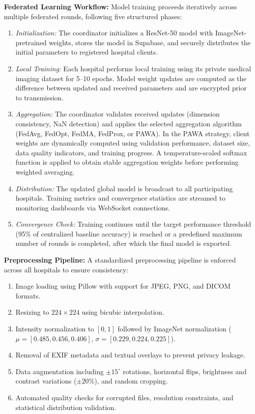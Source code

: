 \textbf{Federated Learning Workflow:}
Model training proceeds iteratively across multiple federated rounds, following five structured phases:

\begin{enumerate}
    \item \textit{Initialization:} The coordinator initializes a ResNet-50 model with ImageNet-pretrained weights, stores the model in Supabase, and securely distributes the initial parameters to registered hospital clients.
    
    \item \textit{Local Training:} Each hospital performs local training using its private medical imaging dataset for 5--10 epochs. Model weight updates are computed as the difference between updated and received parameters and are encrypted prior to transmission.
    
    \item \textit{Aggregation:} The coordinator validates received updates (dimension consistency, NaN detection) and applies the selected aggregation algorithm (FedAvg, FedOpt, FedMA, FedProx, or PAWA). In the PAWA strategy, client weights are dynamically computed using validation performance, dataset size, data quality indicators, and training progress. A temperature-scaled softmax function is applied to obtain stable aggregation weights before performing weighted averaging.
    
    \item \textit{Distribution:} The updated global model is broadcast to all participating hospitals. Training metrics and convergence statistics are streamed to monitoring dashboards via WebSocket connections.
    
    \item \textit{Convergence Check:} Training continues until the target performance threshold (95\% of centralized baseline accuracy) is reached or a predefined maximum number of rounds is completed, after which the final model is exported.
\end{enumerate}

\textbf{Preprocessing Pipeline:}
A standardized preprocessing pipeline is enforced across all hospitals to ensure consistency:

\begin{enumerate}
    \item Image loading using Pillow with support for JPEG, PNG, and DICOM formats.
    \item Resizing to $224 \times 224$ using bicubic interpolation.
    \item Intensity normalization to $[0,1]$ followed by ImageNet normalization ($\mu=[0.485, 0.456, 0.406]$, $\sigma=[0.229, 0.224, 0.225]$).
    \item Removal of EXIF metadata and textual overlays to prevent privacy leakage.
    \item Data augmentation including $\pm15^\circ$ rotations, horizontal flips, brightness and contrast variations ($\pm20\%$), and random cropping.
    \item Automated quality checks for corrupted files, resolution constraints, and statistical distribution validation.
\end{enumerate}

